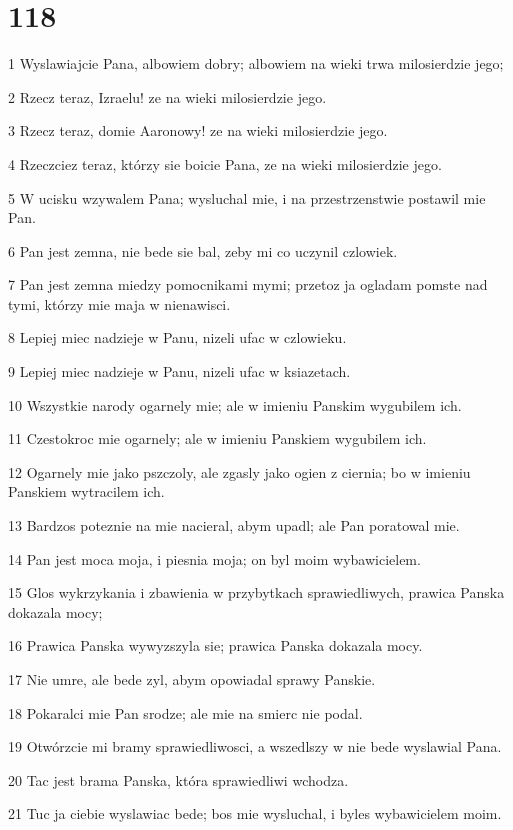 \chapter{118}

\par 1 Wyslawiajcie Pana, albowiem dobry; albowiem na wieki trwa milosierdzie jego;
\par 2 Rzecz teraz, Izraelu! ze na wieki milosierdzie jego.
\par 3 Rzecz teraz, domie Aaronowy! ze na wieki milosierdzie jego.
\par 4 Rzeczciez teraz, którzy sie boicie Pana, ze na wieki milosierdzie jego.
\par 5 W ucisku wzywalem Pana; wysluchal mie, i na przestrzenstwie postawil mie Pan.
\par 6 Pan jest zemna, nie bede sie bal, zeby mi co uczynil czlowiek.
\par 7 Pan jest zemna miedzy pomocnikami mymi; przetoz ja ogladam pomste nad tymi, którzy mie maja w nienawisci.
\par 8 Lepiej miec nadzieje w Panu, nizeli ufac w czlowieku.
\par 9 Lepiej miec nadzieje w Panu, nizeli ufac w ksiazetach.
\par 10 Wszystkie narody ogarnely mie; ale w imieniu Panskim wygubilem ich.
\par 11 Czestokroc mie ogarnely; ale w imieniu Panskiem wygubilem ich.
\par 12 Ogarnely mie jako pszczoly, ale zgasly jako ogien z ciernia; bo w imieniu Panskiem wytracilem ich.
\par 13 Bardzos poteznie na mie nacieral, abym upadl; ale Pan poratowal mie.
\par 14 Pan jest moca moja, i piesnia moja; on byl moim wybawicielem.
\par 15 Glos wykrzykania i zbawienia w przybytkach sprawiedliwych, prawica Panska dokazala mocy;
\par 16 Prawica Panska wywyzszyla sie; prawica Panska dokazala mocy.
\par 17 Nie umre, ale bede zyl, abym opowiadal sprawy Panskie.
\par 18 Pokaralci mie Pan srodze; ale mie na smierc nie podal.
\par 19 Otwórzcie mi bramy sprawiedliwosci, a wszedlszy w nie bede wyslawial Pana.
\par 20 Tac jest brama Panska, która sprawiedliwi wchodza.
\par 21 Tuc ja ciebie wyslawiac bede; bos mie wysluchal, i byles wybawicielem moim.
